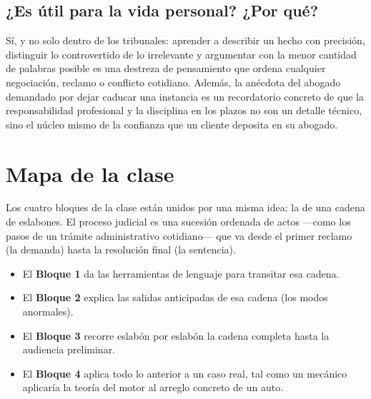 \documentclass[12pt,oneside]{book}
\begin{document}
\subsection{¿Es útil para la vida personal? ¿Por qué?}

Sí, y no solo dentro de los tribunales: aprender a describir un hecho con precisión, distinguir lo controvertido de lo irrelevante y argumentar con la menor cantidad de palabras posible es una destreza de pensamiento que ordena cualquier negociación, reclamo o conflicto cotidiano. Además, la anécdota del abogado demandado por dejar caducar una instancia es un recordatorio concreto de que la responsabilidad profesional y la disciplina en los plazos no son un detalle técnico, sino el núcleo mismo de la confianza que un cliente deposita en su abogado.

\section{Mapa de la clase}

Los cuatro bloques de la clase están unidos por una misma idea: la de una cadena de eslabones. El proceso judicial es una sucesión ordenada de actos ---como los pasos de un trámite administrativo cotidiano--- que va desde el primer reclamo (la demanda) hasta la resolución final (la sentencia).

\begin{itemize}
    \item El \textbf{Bloque 1} da las herramientas de lenguaje para transitar esa cadena.
    \item El \textbf{Bloque 2} explica las salidas anticipadas de esa cadena (los modos anormales).
    \item El \textbf{Bloque 3} recorre eslabón por eslabón la cadena completa hasta la audiencia preliminar.
    \item El \textbf{Bloque 4} aplica todo lo anterior a un caso real, tal como un mecánico aplicaría la teoría del motor al arreglo concreto de un auto.
\end{itemize}
\end{document}
